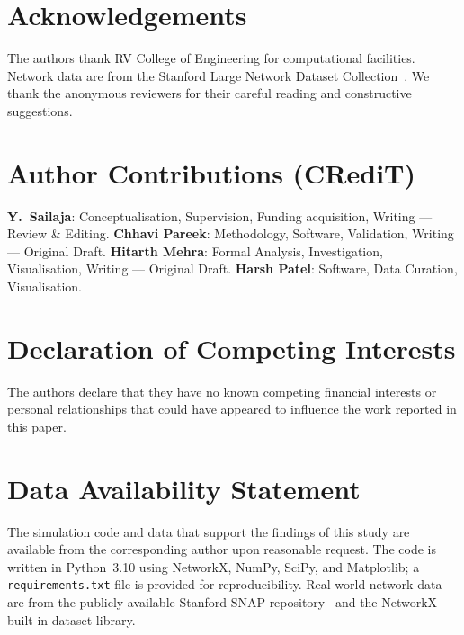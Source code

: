 \documentclass[review,12pt]{elsarticle}
\begin{document}
\section*{Acknowledgements}

The authors thank RV College of Engineering for computational facilities.
Network data are from the Stanford Large Network Dataset
Collection~\cite{snapnets}.  We thank the anonymous reviewers for their
careful reading and constructive suggestions.

\section*{Author Contributions (CRediT)}

\textbf{Y.~Sailaja}: Conceptualisation, Supervision, Funding acquisition,
Writing --- Review \& Editing.
\textbf{Chhavi Pareek}: Methodology, Software, Validation,
Writing --- Original Draft.
\textbf{Hitarth Mehra}: Formal Analysis, Investigation, Visualisation,
Writing --- Original Draft.
\textbf{Harsh Patel}: Software, Data Curation, Visualisation.

\section*{Declaration of Competing Interests}

The authors declare that they have no known competing financial interests or
personal relationships that could have appeared to influence the work reported
in this paper.

\section*{Data Availability Statement}

The simulation code and data that support the findings of this study are
available from the corresponding author upon reasonable request.  The code
is written in Python~3.10 using NetworkX, NumPy, SciPy, and Matplotlib;
a \texttt{requirements.txt} file is provided for reproducibility.
Real-world network data are from the publicly available Stanford SNAP
repository~\cite{snapnets} and the NetworkX built-in dataset library.



\end{document}
